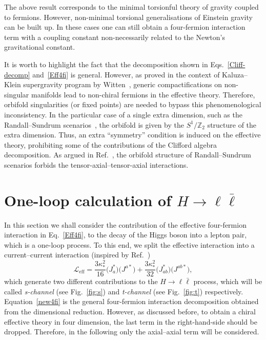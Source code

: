 \documentclass{ws-mpla}
\newcommand{\Lag}{\mathscr{L}}
\renewcommand{\(}{\left(}
\renewcommand{\)}{\right)}
\renewcommand{\[}{\left[}
\renewcommand{\]}{\right]}
\begin{document}
The above result corresponds to the minimal torsionful theory of gravity coupled to fermions. However, non-minimal torsional generalisations of Einstein gravity can be built up. In these cases one can still obtain a four-fermion interaction term with a coupling constant non-necessarily related to the Newton's gravitational constant.\cite{Belyaev:1997zv,Belyaev:1998ax,Belyaev:2007fn,Fabbri:2011kq}

It is worth to highlight the fact that the decomposition shown in Eqs.~\eqref{Cliff-decomp} and~\eqref{Eff4fi} is general. However, as proved in the context of Kaluza--Klein supergravity  program by Witten~\cite{Witten:1981me}, generic compactifications on non-singular manifolds lead to non-chiral fermions in the effective theory. Therefore, orbifold singularities (or fixed points) are needed to bypass this phenomenological inconsistency. In the particular case of a single extra dimension, such as the Randall--Sundrum scenarios~\cite{RS1,RS2}, the orbifold is given by the $S^1 / \mathbb{Z}_2$ structure of the extra dimension. Thus, an extra ``symmetry'' condition is induced on the effective theory, prohibiting some of the contributions of the Clifford algebra decomposition. As argued in Ref.~, the orbifold structure of Randall--Sundrum scenarios forbids the tensor-axial--tensor-axial interactions.


\section{One-loop calculation of $H \to \ell \bar{\ell}$}\label{1loop}

In this section we shall consider the contribution of the effective four-fermion interaction in Eq.~\eqref{Eff4fi}, to the decay of the Higgs boson into a lepton pair, which is a one-loop process. To this end, we split the effective interaction into a current--current interaction (inspired by Ref.~)
\begin{equation}
  \Lag_{\text{eff}} = \frac{3 \kappa_*^2}{16} \big( J_{a}^* \big) \big( J^{a*} \big) + \frac{3 \kappa_*^2}{32} \big( J_{ab}^* \big) \big( J^{ab*} \big),
  \label{new4fi}
\end{equation}
which generate two different contributions to the $H \to \ell \bar{\ell}$ process, which will be called \emph{s-channel} (see Fig.~\ref{fig:s}) and \emph{t-channel} (see Fig.~\ref{fig:t}) respectively. Equation~\eqref{new4fi} is the general four-fermion interaction decomposition obtained from the dimensional reduction. However, as discussed before, to obtain a chiral effective theory in four dimension, the last term in the right-hand-side should be dropped. Therefore, in the following only the axial--axial term will be considered.
\end{document}
